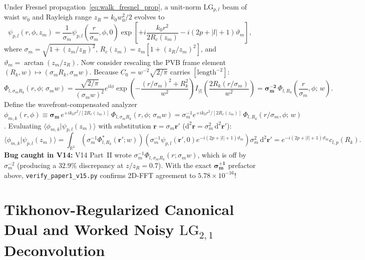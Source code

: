 \documentclass[10pt,letterpaper]{article}
\newcommand{\braket}[2]{\langle #1 | #2 \rangle}
\newcommand{\abs}[1]{\lvert #1 \rvert}
\newcommand{\dd}{\mathrm{d}}
\numberwithin{equation}{section}
\begin{document}
\begin{auditbox}
Under Fresnel propagation~\eqref{eq:walk_fresnel_prop}, a unit-norm $\mathrm{LG}_{p,l}$ beam of waist $w_0$ and Rayleigh range $z_R = k_0 w_0^2/2$ evolves to
\begin{equation}
  \psi_{p,l}(r,\phi,z_m) = \frac{1}{\sigma_m}\psi_{p,l}\!\left(\frac{r}{\sigma_m},\phi,0\right)\exp\!\left[+i\frac{k_0 r^2}{2 R_c(z_m)} - i(2p+\abs{l}+1)\vartheta_m\right],
\end{equation}
where $\sigma_m = \sqrt{1+(z_m/z_R)^2}$, $R_c(z_m) = z_m[1+(z_R/z_m)^2]$, and $\vartheta_m = \arctan(z_m/z_R)$. Now consider rescaling the PVB frame element $(R_k, w) \mapsto (\sigma_m R_k, \sigma_m w)$. Because $C_0 = w^{-2}\sqrt{2/\pi}$ carries $[\mathrm{length}^{-2}]$:
\begin{equation}
  \Phi_{l,\sigma_m R_k}(r,\phi;\,\sigma_m w) = \frac{\sqrt{2/\pi}}{(\sigma_m w)^2} e^{il\phi}\exp\!\left(-\frac{(r/\sigma_m)^2 + R_k^2}{w^2}\right) I_{\abs{l}}\!\left(\frac{2R_k (r/\sigma_m)}{w^2}\right) = \mathbf{\sigma_m^{-2}}\,\Phi_{l,R_k}\!\left(\frac{r}{\sigma_m},\phi;\,w\right).
\end{equation}
Define the wavefront-compensated analyzer $\phi_{m,k}(r,\phi) \equiv \mathbf{\sigma_m}\,e^{+ik_0 r^2/[2R_c(z_m)]}\,\Phi_{l,\sigma_m R_k}(r,\phi;\,\sigma_m w) = \sigma_m^{-1} e^{+ik_0 r^2/[2R_c(z_m)]}\,\Phi_{l,R_k}(r/\sigma_m,\phi;\,w)$. Evaluating $\braket{\phi_{m,k}}{\psi_{p,l}(z_m)}$ with substitution $\mathbf{r} = \sigma_m\mathbf{r}'$ ($\dd^2\mathbf{r} = \sigma_m^2\,\dd^2\mathbf{r}'$):
\begin{equation}
  \braket{\phi_{m,k}}{\psi_{p,l}(z_m)} = \int_{\mathbb{R}^2} \left(\sigma_m^{-1}\Phi_{l,R_k}^*(\mathbf{r}';w)\right)\left(\sigma_m^{-1}\psi_{p,l}(\mathbf{r}',0) e^{-i(2p+\abs{l}+1)\vartheta_m}\right) \sigma_m^2\,\dd^2\mathbf{r}' = e^{-i(2p+\abs{l}+1)\vartheta_m} c_{l,p}(R_k).
\end{equation}
\textbf{Bug caught in V14:} V14 Part~II wrote $\sigma_m^{-1}\Phi_{l,\sigma_m R_k}(r;\sigma_m w)$, which is off by $\sigma_m^{-2}$ (producing a $32.9\%$ discrepancy at $z/z_R = 0.7$). With the exact $\mathbf{\sigma_m^{+1}}$ prefactor above, \texttt{verify\_paper1\_v15.py} confirms 2D-FFT agreement to $5.78\times 10^{-16}$!
\end{auditbox}

\section{Tikhonov-Regularized Canonical Dual and Worked Noisy $\mathrm{LG}_{2,1}$ Deconvolution}
\label{sec:p1_tikhonov}
\end{document}
